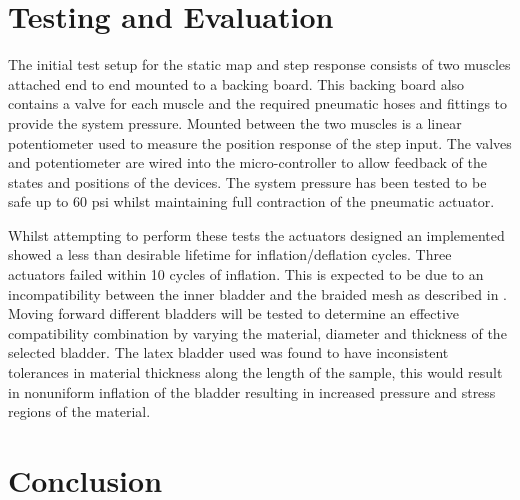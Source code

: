 \documentclass[11pt,a4paper]{article}
\begin{document}
\clearpage
\section{Testing and Evaluation}
\label{sec:results}

The initial test setup for the static map and step response consists of two muscles attached end to end mounted to a backing board. This backing board also contains a valve for each muscle and the required pneumatic hoses and fittings to provide the system pressure. Mounted between the two muscles is a linear potentiometer used to measure the position response of the step input. The valves and potentiometer are wired into the micro-controller to allow feedback of the states and positions of the devices. The system pressure has been tested to be safe up to 60 psi whilst maintaining full contraction of the pneumatic actuator.\newline

Whilst attempting to perform these tests the actuators designed an implemented showed a less than desirable lifetime for inflation/deflation cycles. Three actuators failed within 10 cycles of inflation. This is expected to be due to an incompatibility between the inner bladder and the braided mesh as described in \cite{andrikopoulos_nikolakopoulos_2017}. Moving forward different bladders will be tested to determine an effective compatibility combination by varying the material, diameter and thickness of the selected bladder. The latex bladder used was found to have inconsistent tolerances in material thickness along the length of the sample, this would result in nonuniform inflation of the bladder resulting in increased pressure and stress regions of the material.

\newpage
\section{Conclusion}
\label{sec:conclusion}
\end{document}
